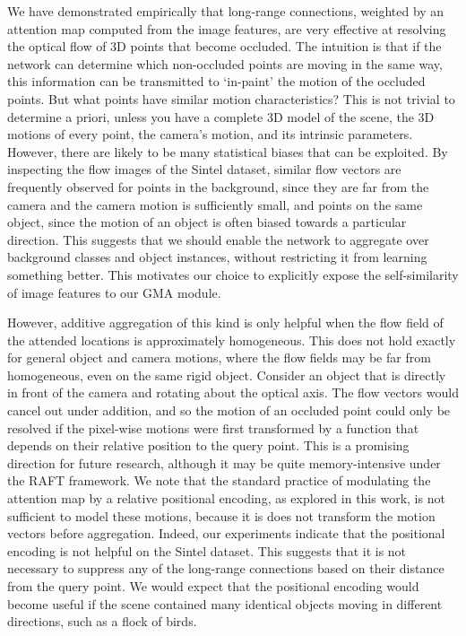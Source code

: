 \documentclass[10pt,twocolumn,letterpaper]{article}
\begin{document}
We have demonstrated empirically that long-range connections, weighted by an attention map computed from the image features, are very effective at resolving the optical flow of 3D points that become occluded.
The intuition is that if the network can determine which non-occluded points are moving in the same way, this information can be transmitted to `in-paint' the motion of the occluded points.
But what points have similar motion characteristics? This is not trivial to determine a priori, unless you have a complete 3D model of the scene, the 3D motions of every point, the camera's motion, and its intrinsic parameters.
However, there are likely to be many statistical biases that can be exploited.
By inspecting the flow images of the Sintel dataset, similar flow vectors are frequently observed for points in the background, since they are far from the camera and the camera motion is sufficiently small, and points on the same object, since the motion of an object is often biased towards a particular direction.
This suggests that we should enable the network to aggregate over background classes and object instances, without restricting it from learning something better.
This motivates our choice to explicitly expose the self-similarity of image features to our GMA module. 


However, additive aggregation of this kind is only helpful when the flow field of the attended locations is approximately homogeneous.
This does not hold exactly for general object and camera motions, where the flow fields may be far from homogeneous, even on the same rigid object.
Consider an object that is directly in front of the camera and rotating about the optical axis.
The flow vectors would cancel out under addition, and so the motion of an occluded point could only be resolved if the pixel-wise motions were first transformed by a function that depends on their relative position to the query point.
This is a promising direction for future research, although it may be quite memory-intensive under the RAFT framework.
We note that the standard practice of modulating the attention map by a relative positional encoding, as explored in this work, is not sufficient to model these motions, because it is does not transform the motion vectors before aggregation.
Indeed, our experiments indicate that the positional encoding is not helpful on the Sintel dataset.
This suggests that it is not necessary to suppress any of the long-range connections based on their distance from the query point.
We would expect that the positional encoding would become useful if the scene contained many identical objects moving in different directions, such as a flock of birds.
\end{document}
